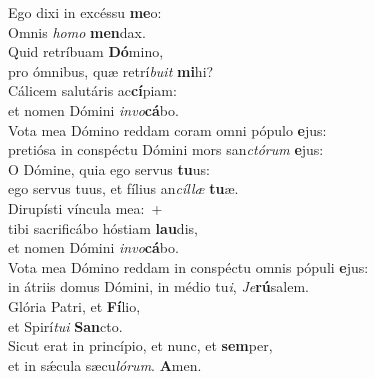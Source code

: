 \evenverse Ego dixi in excéssu \textbf{me}o:~\*\\
\evenverse Omnis \textit{ho}\textit{mo} \textbf{men}dax.\\
\oddverse Quid retríbuam \textbf{Dó}mino,~\*\\
\oddverse pro ómnibus, quæ retrí\textit{bu}\textit{it} \textbf{mi}hi?\\
\evenverse Cálicem salutáris ac\textbf{cí}piam:~\*\\
\evenverse et nomen Dómini \textit{in}\textit{vo}\textbf{cá}bo.\\
\oddverse Vota mea Dómino reddam coram omni pópulo \textbf{e}jus:~\*\\
\oddverse pretiósa in conspéctu Dómini mors san\textit{ctó}\textit{rum} \textbf{e}jus:\\
\evenverse O Dómine, quia ego servus \textbf{tu}us:~\*\\
\evenverse ego servus tuus, et fílius an\textit{cíl}\textit{læ} \textbf{tu}æ.\\
\oddverse Dirupísti víncula mea:~+\\
\oddverse  tibi sacrificábo hóstiam \textbf{lau}dis,~\*\\
\oddverse et nomen Dómini \textit{in}\textit{vo}\textbf{cá}bo.\\
\evenverse Vota mea Dómino reddam in conspéctu omnis pópuli \textbf{e}jus:~\*\\
\evenverse in átriis domus Dómini, in médio tu\textit{i}, \textit{Je}\textbf{rú}salem.\\
\oddverse Glória Patri, et \textbf{Fí}lio,~\*\\
\oddverse et Spirí\textit{tu}\textit{i} \textbf{San}cto.\\
\evenverse Sicut erat in princípio, et nunc, et \textbf{sem}per,~\*\\
\evenverse et in sǽcula sæcu\textit{ló}\textit{rum}. \textbf{A}men.\\
